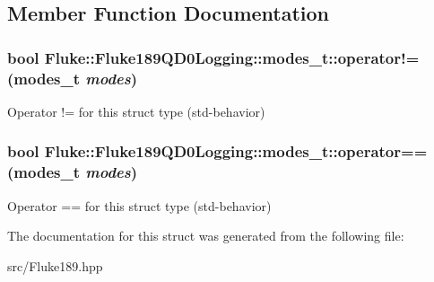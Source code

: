 \subsection{Member Function Documentation}
\hypertarget{structFluke_1_1Fluke189QD0Logging_1_1modes__t_a0dff151c2a364e53b9fc1dfcbda878b7}{
\subsubsection[{operator!=}]{\setlength{\rightskip}{0pt plus 5cm}bool Fluke::Fluke189QD0Logging::modes\_\-t::operator!= ({\bf modes\_\-t} {\em modes})}}
\label{structFluke_1_1Fluke189QD0Logging_1_1modes__t_a0dff151c2a364e53b9fc1dfcbda878b7}
Operator != for this struct type (std-\/behavior) \hypertarget{structFluke_1_1Fluke189QD0Logging_1_1modes__t_a65967f61529859ff86e92dc060199b2e}{
\subsubsection[{operator==}]{\setlength{\rightskip}{0pt plus 5cm}bool Fluke::Fluke189QD0Logging::modes\_\-t::operator== ({\bf modes\_\-t} {\em modes})}}
\label{structFluke_1_1Fluke189QD0Logging_1_1modes__t_a65967f61529859ff86e92dc060199b2e}
Operator == for this struct type (std-\/behavior) 

The documentation for this struct was generated from the following file:\begin{DoxyCompactItemize}
\item 
src/Fluke189.hpp\end{DoxyCompactItemize}
